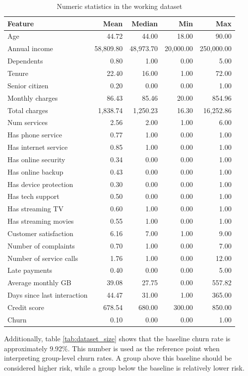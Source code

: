 \begin{table}[h]
\centering
\caption{Numeric statistics in the working dataset}
\label{tab:working_numeric_stats}
\begin{tabular}{lrrrr}
\toprule
\textbf{Feature} & \textbf{Mean} & \textbf{Median} & \textbf{Min} & \textbf{Max} \\
\midrule
Age & 44.72 & 44.00 & 18.00 & 90.00 \\
Annual income & 58,809.80 & 48,973.70 & 20,000.00 & 250,000.00 \\
Dependents & 0.80 & 1.00 & 0.00 & 5.00 \\
Tenure & 22.40 & 16.00 & 1.00 & 72.00 \\
Senior citizen & 0.20 & 0.00 & 0.00 & 1.00 \\
Monthly charges & 86.43 & 85.46 & 20.00 & 854.96 \\
Total charges & 1,838.74 & 1,250.23 & 16.30 & 16,252.86 \\
Num services & 2.56 & 2.00 & 1.00 & 6.00 \\
Has phone service & 0.77 & 1.00 & 0.00 & 1.00 \\
Has internet service & 0.85 & 1.00 & 0.00 & 1.00 \\
Has online security & 0.34 & 0.00 & 0.00 & 1.00 \\
Has online backup & 0.43 & 0.00 & 0.00 & 1.00 \\
Has device protection & 0.30 & 0.00 & 0.00 & 1.00 \\
Has tech support & 0.50 & 0.00 & 0.00 & 1.00 \\
Has streaming TV & 0.60 & 1.00 & 0.00 & 1.00 \\
Has streaming movies & 0.55 & 1.00 & 0.00 & 1.00 \\
Customer satisfaction & 6.16 & 7.00 & 1.00 & 9.00 \\
Number of complaints & 0.70 & 1.00 & 0.00 & 7.00 \\
Number of service calls & 1.76 & 1.00 & 0.00 & 12.00 \\
Late payments & 0.40 & 0.00 & 0.00 & 5.00 \\
Average monthly GB & 39.08 & 27.75 & 0.00 & 557.82 \\
Days since last interaction & 44.47 & 31.00 & 1.00 & 365.00 \\
Credit score & 678.54 & 680.00 & 300.00 & 850.00 \\
Churn & 0.10 & 0.00 & 0.00 & 1.00 \\
\bottomrule
\end{tabular}
\end{table}

Additionally, table \ref{tab:dataset_size} shows that the baseline churn rate is approximately 9.92\%. This number is used as the reference point when interpreting group-level churn rates. A group above this baseline should be considered higher risk, while a group below the baseline is relatively lower risk.